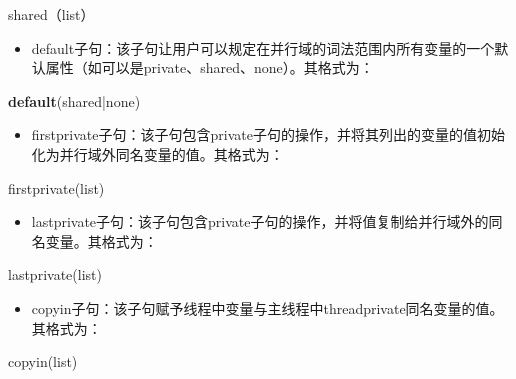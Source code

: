 \documentclass[]{ctexbook}
\newenvironment{Shaded}{\begin{snugshade}}{\end{snugshade}}
\newcommand{\ControlFlowTok}[1]{\textcolor[rgb]{0.13,0.29,0.53}{\textbf{#1}}}
\newcommand{\NormalTok}[1]{#1}
\providecommand{\tightlist}{%
  \setlength{\itemsep}{0pt}\setlength{\parskip}{0pt}}
\begin{document}
\begin{Shaded}
\begin{Highlighting}[]
\NormalTok{shared（list）}
\end{Highlighting}
\end{Shaded}

\begin{itemize}
\tightlist
\item
  default子句：该子句让用户可以规定在并行域的词法范围内所有变量的一个默认属性（如可以是private、shared、none）。其格式为：
\end{itemize}

\begin{Shaded}
\begin{Highlighting}[]
\ControlFlowTok{default}\NormalTok{(shared|none) }
\end{Highlighting}
\end{Shaded}

\begin{itemize}
\tightlist
\item
  firstprivate子句：该子句包含private子句的操作，并将其列出的变量的值初始化为并行域外同名变量的值。其格式为：
\end{itemize}

\begin{Shaded}
\begin{Highlighting}[]
\NormalTok{firstprivate(list)}
\end{Highlighting}
\end{Shaded}

\begin{itemize}
\tightlist
\item
  lastprivate子句：该子句包含private子句的操作，并将值复制给并行域外的同名变量。其格式为：
\end{itemize}

\begin{Shaded}
\begin{Highlighting}[]
\NormalTok{lastprivate(list)}
\end{Highlighting}
\end{Shaded}

\begin{itemize}
\tightlist
\item
  copyin子句：该子句赋予线程中变量与主线程中threadprivate同名变量的值。其格式为：
\end{itemize}

\begin{Shaded}
\begin{Highlighting}[]
\NormalTok{copyin(list)}
\end{Highlighting}
\end{Shaded}
\end{document}
